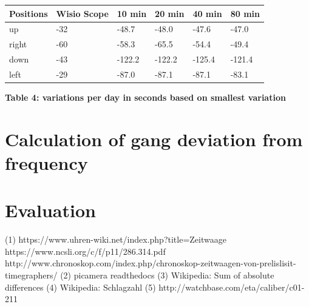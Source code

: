 \documentclass[12pt, a4paper]{report}
\begin{document}
\begin{table}[H]
    \begin{tabular}{|l|l|l|l|l|l|}
    \hline
    Positions & Wisio Scope & 10 min & 20 min & 40 min & 80 min \\ \hline
    up        & -32                & -48.7     & -48.0     & -47.6      & -47.0      \\ \hline
    right     & -60                 & -58.3      & -65.5    & -54.4      & -49.4      \\ \hline
    down      & -43                 & -122.2    & -122.2     & -125.4    & -121.4      \\ \hline
    left      & -29                & -87.0	   & -87.1	  & -87.1	  & -83.1      \\ \hline
    \end{tabular}
\end{table}
\begin{center}    
{\bf Table 4: variations per day in seconds based on smallest variation} 
\end{center}

\section{Calculation of gang deviation from frequency}

\section{Evaluation}


\glsaddall
\printglossaries

\begin{thebibliography}{9}
\bigskip
{} 
(1) https://www.uhren-wiki.net/index.php?title=Zeitwaage
 https://www.ncsli.org/c/f/p11/286.314.pdf
 http://www.chronoskop.com/index.php/chronoskop-zeitwaagen-von-prelislisit-timegraphers/
\bibitem[Picamera]
(2) picamera readthedocs
\bibitem[SAD]
(3) Wikipedia: Sum of absolute differences
\bibitem[Schlagzahl]
(4) Wikipedia: Schlagzahl
(5) http://watchbase.com/eta/caliber/c01-211
\end{thebibliography}

\pagebreak

\listoffigures
\bigskip
\end{document}
